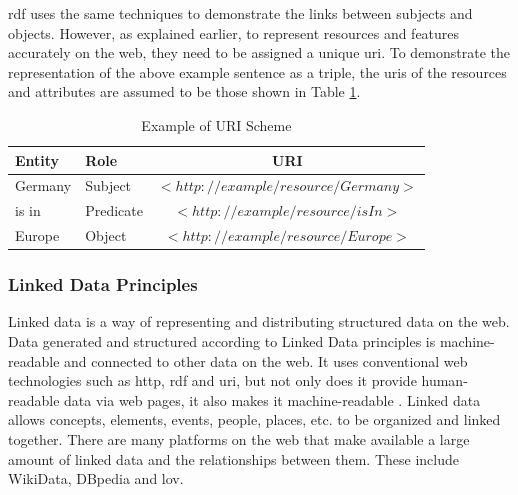     \acrshort{rdf} uses the same techniques to demonstrate the links between subjects and objects. However, as explained earlier, to represent resources and features accurately on the web, they need to be assigned a unique \acrshort{uri}. To demonstrate the representation of the above example sentence as a triple, the \acrshort{uri}s of the resources and attributes are assumed to be those shown in Table \ref{tab:rdf-example-uri}.
    
    \begin{table}[h]
        \centering
	    {
	    \begin{tabular}{ | m{2.5cm} | m{2.5cm} | c | }
            \hline
            \rowcolor{teal!30} \textbf{Entity} & \textbf{Role} & \textbf{URI} \\
            
            \hline
            Germany  & Subject & $<http://example/resource/Germany>$\\
            
            \hline
            is in  & Predicate & $<http://example/resource/isIn>$\\
            
            \hline
            Europe  & Object & $<http://example/resource/Europe>$\\
            
            \hline
        \end{tabular}}
        \caption{\label{tab:rdf-example-uri} Example of URI Scheme}
    \end{table}

    \subsubsection{Linked Data Principles}
    Linked data is a way of representing and distributing structured data on the web. Data generated and structured according to Linked Data principles is machine-readable and connected to other data on the web. It uses conventional web technologies such as \acrshort{http}, \acrshort{rdf} and \acrshort{uri}, but not only does it provide human-readable data via web pages, it also makes it machine-readable \cite{bizer2008linked}. Linked data allows concepts, elements, events, people, places, etc. to be organized and linked together. There are many platforms on the web that make available a large amount of linked data and the relationships between them. These include WikiData, DBpedia and \acrfull{lov}.\\

